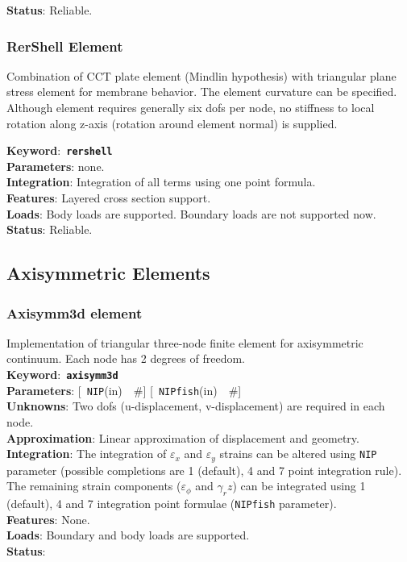 \documentclass[a4paper]{article}
\newcommand{\descitem}[1]{{\noindent \bf #1}:}
\newcommand{\elemkeyword}[1]{\descitem{Keyword}~{\bf \texttt{#1}}}
\newcommand{\elemparam}[2]{{{\texttt{#1}\tiny (#2)}~~\#}}
\newcommand{\optelemparam}[2]{{[~\elemparam{#1}{#2}]}}
\newcommand{\param}[1]{{\texttt{#1}}}
\begin{document}
\descitem{Status} Reliable.

\subsubsection {RerShell Element}
Combination of CCT plate element (Mindlin hypothesis) with triangular plane stress element
for membrane behavior. The element curvature can be specified. 
Although element requires generally six dofs per node, no stiffness to
local rotation along z-axis (rotation around element normal) is supplied.

\elemkeyword{rershell}\\
\descitem{Parameters} none.\\
\descitem{Integration}
Integration of all terms using one point formula.\\
\descitem{Features} Layered cross section support.\\
\descitem{Loads} Body loads are supported. Boundary loads are
not supported now.\\
\descitem{Status} Reliable.

\subsection{Axisymmetric Elements}
\subsubsection{Axisymm3d element}
Implementation of triangular three-node finite element 
for axisymmetric continuum. Each node has 2 degrees of freedom.\\
\elemkeyword{axisymm3d}\\
\descitem{Parameters} \optelemparam{NIP}{in} \optelemparam{NIPfish}{in}\\
\descitem{Unknowns}
Two dofs (u-displacement, v-displacement) are required in each node.\\
\descitem{Approximation} Linear approximation of displacement and
geometry.\\
\descitem{Integration}
The integration of $\varepsilon_x$ and $\varepsilon_y$ strains can be altered using
\param{NIP} parameter (possible completions are 1 (default), 4 and 7
point integration rule). The remaining strain components ($\varepsilon_\phi$ and
$\gamma_rz$) can be integrated using 1 (default), 4 and 7 integration
point formulae (\param{NIPfish} parameter).\\
\descitem{Features} None.\\
\descitem{Loads} Boundary and body loads are supported.\\
\descitem{Status} 
\end{document}
